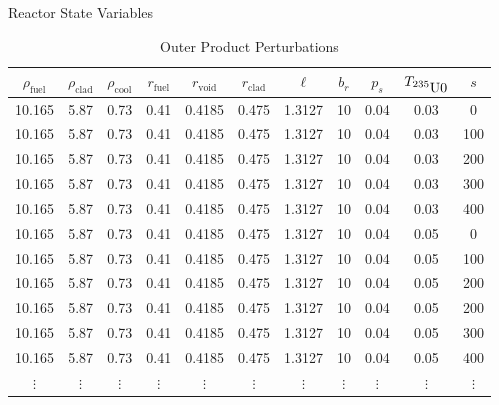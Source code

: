 \documentclass[pdf, autumn, slideColor, nocolorBG]{prosper}
\newcommand{\superscript}[1]{\ensuremath{^{\textrm{#1}}}}
\newcommand{\nuc}[2]{\superscript{#2}{#1}}
\begin{document}
\begin{slide}{Reactor State Variables}
\begin{table}[htbp]
\begin{center}
\caption{Outer Product Perturbations}
\tiny
\begin{tabular}{|ccccccccccc|}
\hline
\textbf{$\rho_{\mbox{fuel}}$} & \textbf{$\rho_{\mbox{clad}}$} & \textbf{$\rho_{\mbox{cool}}$} & \textbf{$r_{\mbox{fuel}}$} & \textbf{$r_{\mbox{void}}$} & \textbf{$r_{\mbox{clad}}$} & \textbf{$\ell$} & \textbf{$b_r$} & \textbf{$p_s$} & \textbf{$T_{\mbox{\nuc{U}{235}0}}$} & \textbf{$s$} \\
\hline
10.165 & 5.87 & 0.73 & 0.41 & 0.4185 & 0.475 & 1.3127 & 10 & 0.04 & 0.03 & 0   \\
10.165 & 5.87 & 0.73 & 0.41 & 0.4185 & 0.475 & 1.3127 & 10 & 0.04 & 0.03 & 100 \\
10.165 & 5.87 & 0.73 & 0.41 & 0.4185 & 0.475 & 1.3127 & 10 & 0.04 & 0.03 & 200 \\
10.165 & 5.87 & 0.73 & 0.41 & 0.4185 & 0.475 & 1.3127 & 10 & 0.04 & 0.03 & 300 \\
10.165 & 5.87 & 0.73 & 0.41 & 0.4185 & 0.475 & 1.3127 & 10 & 0.04 & 0.03 & 400 \\
10.165 & 5.87 & 0.73 & 0.41 & 0.4185 & 0.475 & 1.3127 & 10 & 0.04 & 0.05 & 0   \\
10.165 & 5.87 & 0.73 & 0.41 & 0.4185 & 0.475 & 1.3127 & 10 & 0.04 & 0.05 & 100 \\
10.165 & 5.87 & 0.73 & 0.41 & 0.4185 & 0.475 & 1.3127 & 10 & 0.04 & 0.05 & 200 \\
10.165 & 5.87 & 0.73 & 0.41 & 0.4185 & 0.475 & 1.3127 & 10 & 0.04 & 0.05 & 200 \\
10.165 & 5.87 & 0.73 & 0.41 & 0.4185 & 0.475 & 1.3127 & 10 & 0.04 & 0.05 & 300 \\
10.165 & 5.87 & 0.73 & 0.41 & 0.4185 & 0.475 & 1.3127 & 10 & 0.04 & 0.05 & 400 \\
$\vdots$ & $\vdots$ & $\vdots$ & $\vdots$ & $\vdots$ & $\vdots$ & $\vdots$ & $\vdots$ & $\vdots$ & $\vdots$ & $\vdots$ \\
\hline
\end{tabular}
\end{center}
\end{table}
\end{slide}
\end{document}
